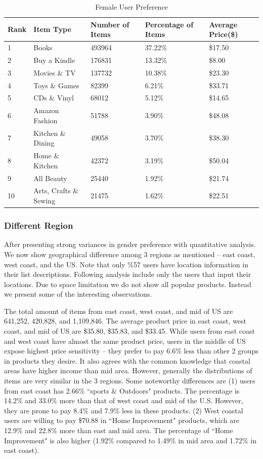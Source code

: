 \begin{table}[!ht]
\centering
\caption{Female User Preference}
\label{tb:female}
\begin{adjustbox}{max width=.5\textwidth}
\begin{tabular}{lllll}
Rank & Item Type          & Number of Items & Percentage of Items & Average Price(\$) \\ \hline
1 & Books & 493964 & 37.22\% & \$17.50 \\
2 & Buy a Kindle & 176831 & 13.32\% & \$8.00 \\
3 & Movies \& TV & 137732 & 10.38\% & \$23.30 \\
4 & Toys \& Games & 82399 & 6.21\% & \$33.71 \\
5 & CDs \& Vinyl & 68012 & 5.12\% & \$14.65 \\
6 & Amazon Fashion & 51788 & 3.90\% & \$48.08 \\
7 & Kitchen \& Dining & 49058 & 3.70\% & \$38.30 \\
8 & Home \& Kitchen & 42372 & 3.19\% & \$50.04 \\
9 & All Beauty & 25440 & 1.92\% & \$21.74 \\
10 & Arts, Crafts \& Sewing & 21475 & 1.62\% & \$22.51 \\
\end{tabular}
\end{adjustbox}
\end{table}

\subsubsection{Different Region}

After presenting strong variances in gender preference with quantitative analysis. We now show geographical difference among 3 regions as mentioned -- east coast, west coast, and the US. Note that only \%57 users have location information in their list descriptions. Following analysis include only the users that input their locations. Due to space limitation we do not show all popular products. Instead we present some of the interesting observations. 

The total amount of items from east coast, west coast, and mid of US are 641,252, 420,828, and 1,109,846. The average product price in east coast, west coast, and mid of US are \$35.80, \$35.83, and \$33.45. While users from east coast and west coast have almost the same product price, users in the middle of US expose highest price sensitivity -- they prefer to pay 6.6\% less than other 2 groups in products they desire. It also agrees with the common knowledge that coastal areas have higher income than mid area. However, generally the distributions of items are very similar in the 3 regions. Some noteworthy differences are (1) users from east coast has 2.66\% ``sports \& Outdoors" products. The percentage is 14.2\% and 33.0\% more than that of west coast and mid of the U.S. However, they are prone to pay 8.4\% and 7.9\% less in these products. (2) West coastal users are willing to pay \$70.88 in ``Home Improvement" products, which are 12.9\% and 22.8\% more than east and mid area. The percentage of ``Home Improvement" is also higher (1.92\% compared to 1.49\% in mid area and 1.72\% in east coast). 


